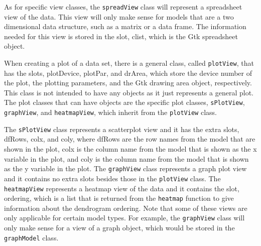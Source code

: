 \documentclass{article}[11pt]
\newcommand{\Rfunction}[1]{{\texttt{#1}}}
\newcommand{\Robject}[1]{{\texttt{#1}}}
\begin{document}
As for specific view classes, the \Robject{spreadView} class will represent a
spreadsheet view of the data.  This view will only make sense for models that
are a two dimensional data structure, such as a matrix or a data frame.  The
information needed for this view is stored in the slot, clist, which is the
Gtk spreadsheet object.

When creating a plot of a data set, there is a general class, called
\Robject{plotView}, that has the slots, plotDevice, plotPar, and drArea, which
store the device number of the plot, the plotting parameters, and the Gtk
drawing area object, respectively.  This class is not intended to have any
objects as it just represents a general plot.  The plot classes that can have
objects are the specific plot classes, \Robject{sPlotView},
\Robject{graphView}, and \Robject{heatmapView}, which inherit from the
\Robject{plotView} class.  

The \Robject{sPlotView} class represents a scatterplot view and it has the
extra slots, dfRows, colx, and coly, where dfRows are the row names from the
model that are shown in the plot, colx is the column name from the model that
is shown as the x variable in the plot, and coly is the column name from the
model that is shown as the y variable in the plot.  The \Robject{graphView}
class represents a graph plot view and it contains no extra slots besides
those in the \Robject{plotView} class.  The \Robject{heatmapView} represents a
heatmap view of the data and it contains the slot, ordering, which is a list
that is returned from the \Rfunction{heatmap} function to give information
about the dendrogram ordering.  Note that some of these views are only
applicable for certain model types. For example, the \Robject{graphView} class
will only make sense for a view of a graph object, which would be stored in the
\Robject{graphModel} class. 
\end{document}
